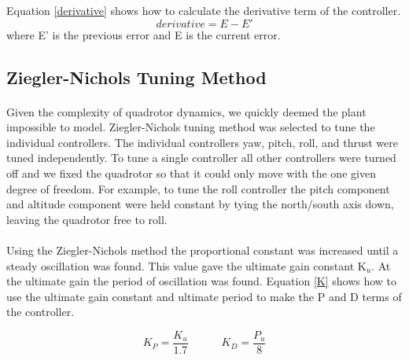 Equation \ref{derivative} shows how to calculate the derivative term of the controller. 
\begin{equation}
derivative = E-E'
\label{derivative}
\end{equation}
where E’ is the previous error and E is the current error.

\subsection{Ziegler-Nichols Tuning Method\label{PID_Tune}}
\paragraph{}
Given the complexity of quadrotor dynamics, we quickly deemed the plant impossible to model.  Ziegler-Nichols tuning method was selected to tune the individual controllers. The individual controllers yaw, pitch, roll, and thrust were tuned independently. To tune a single controller all other controllers were turned off and we fixed the quadrotor so that it could only move with the one given degree of freedom.  For example, to tune the roll controller the pitch component and altitude component were held constant by tying the north/south axis down, leaving the quadrotor free to roll. 
\paragraph{}
Using the Ziegler-Nichols method the proportional constant was increased until a steady oscillation was found. This value gave the ultimate gain constant K$_u$.  At the ultimate gain the period of oscillation was found. Equation \ref{K} shows how to use the ultimate gain constant and ultimate period to make the P and D terms of the controller. 

\begin{equation}
K_P = \frac{K_u}{1.7}
\quad \quad \quad
K_D = \frac{P_u}{8}
\label{K}
\end{equation}
